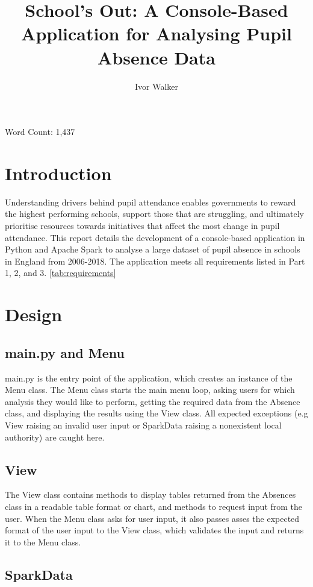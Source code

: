 \documentclass{article}
\title{School's Out: A Console-Based Application for Analysing Pupil Absence Data}
\author{Ivor Walker}
\date{}
\begin{document}
\maketitle
Word Count: 1,437

\newpage

\section*{Introduction}
Understanding drivers behind pupil attendance enables governments to reward the highest performing schools, support those that are struggling, and ultimately prioritise resources towards initiatives that affect the most change in pupil attendance. This report details the development of a console-based application in Python and Apache Spark to analyse a large dataset of pupil absence in schools in England from 2006-2018. The application meets all requirements listed in Part 1, 2, and 3. \ref{tab:requirements}

\section*{Design}
    \subsection*{main.py and Menu}
    main.py is the entry point of the application, which creates an instance of the Menu class. The Menu class starts the main menu loop, asking users for which analysis they would like to perform, getting the required data from the Absence class, and displaying the results using the View class. All expected exceptions (e.g View raising an invalid user input or SparkData raising a nonexistent local authority) are caught here.

    \subsection*{View}
        The View class contains methods to display tables returned from the Absences class in a readable table format or chart, and methods to request input from the user. When the Menu class asks for user input, it also passes asses the expected format of the user input to the View class, which validates the input and returns it to the Menu class.

    \subsection*{SparkData}
\end{document}
